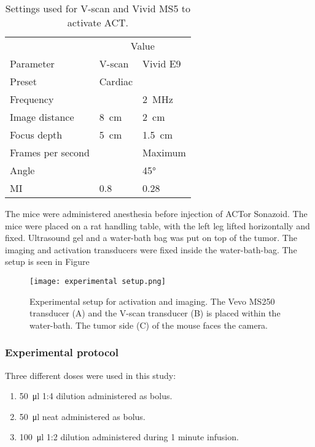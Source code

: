  
\begin{table}[htb]
\caption{Settings used for V-scan and Vivid MS5 to activate ACT\texttrademark.}
\label{tab:V-scan vivid}
\begin{center}
\begin{tabular}{@{}l l l @{}}\toprule
& \multicolumn{2}{c}{Value} \\ \cmidrule(r){2-3}
Parameter & V-scan & Vivid E9\\
\midrule
Preset & Cardiac & \\
Frequency & & \SI{2}{\mega\hertz}\\
Image distance & \SI{8}{\centi\meter} & \SI{2}{\centi\meter}\\
Focus depth & \SI{5}{\centi\meter} & \SI{1.5}{\centi\meter}\\
Frames per second & &Maximum\\
Angle & & \ang{45}\\
MI & \num{0.8} & \num{0.28} \\
  \bottomrule
\end{tabular}
\end{center}
\end{table}

The mice were administered anesthesia before injection of ACT\texttrademark or Sonazoid\texttrademark. The mice were placed on a rat handling table, with the left leg lifted horizontally and fixed. Ultrasound gel and a water-bath bag was put on top of the tumor. The imaging and activation transducers were fixed inside the water-bath-bag. The setup is seen in Figure

\begin{figure}[h]
  \centering
  \texttt{[image: experimental setup.png]}
  \caption{Experimental setup for activation and imaging. The Vevo MS250 transducer (A) and the V-scan transducer (B) is placed within the water-bath. The tumor side (C) of the mouse faces the camera.}
  \label{Fig:setup}
\end{figure}



\subsubsection{Experimental protocol}
Three different doses were used in this study:

\begin{enumerate}
  \item \SI{50}{\micro\litre} 1:4 dilution administered as bolus.
  \item \SI{50}{\micro\litre} neat administered as bolus.
  \item \SI{100}{\micro\litre} 1:2 dilution administered during 1 minute infusion.
\end{enumerate}
 
